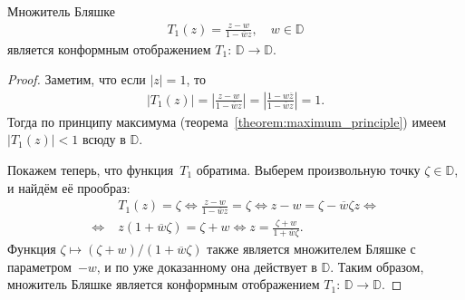 \documentclass[../complex-analysis.tex]{subfiles}
\begin{document}
\begin{remrk}
 \label{remark:T1_conformal}
 Множитель Бляшке
 \begin{align*}
  T_1(z) = \frac{z - w}{1 - \overline w z}, \quad w \in \mathbb D
 \end{align*}
 является конформным отображением $ T_1 \colon\,\mathbb D \to \mathbb D $.
\end{remrk}
\begin{proof}
 Заметим, что если $\left| z \right| = 1$, то
 \begin{align*}
  \left| T_1(z) \right| = \left|\frac{z - w}{1 - \overline w z}\right| = \left|\frac{1 - w \overline z}{1 - \overline w z}\right| = 1.
 \end{align*} Тогда по принципу максимума (теорема~\ref{theorem:maximum_principle}) имеем $ \left| T_1(z) \right| < 1 $ всюду в $ \mathbb D $.

 Покажем теперь, что функция~$ T_1 $ обратима. Выберем произвольную точку $ \zeta \in \mathbb D $, и найдём её прообраз:
 \begin{align*}
  &T_1(z) = \zeta \iff \frac{z - w}{1 - \overline w z} = \zeta \iff z - w = \zeta - \overline w \zeta z \iff \\
  \iff\;& z(1 + \overline w \zeta) = \zeta + w \iff z = \frac{\zeta + w}{1 + \overline w \zeta}.
 \end{align*} Функция $ \zeta \mapsto (\zeta + w) / (1 + \overline w \zeta) $ также является множителем Бляшке с параметром~$ -w $, и по уже доказанному она действует в $ \mathbb D $. Таким образом, множитель Бляшке является конформным отображением $ T_1 \colon\,\mathbb D \to \mathbb D $.
\end{proof}
\end{document}
